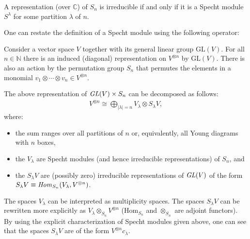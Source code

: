     \begin{property}
        A representation (over $\mathbb{C}$) of $S_n$ is irreducible if and only if it is a Specht module $S^\lambda$ for some partition $\lambda$ of $n$.
    \end{property}

    One can restate the definition of a Specht module using the following operator:

    Consider a vector space $V$ together with its general linear group $\text{GL}(V)$. For all $n\in\mathbb{N}$ there is an induced (diagonal) representation on $V^{\otimes n}$ by $\text{GL}(V)$. There is also an action by the permutation group $S_n$ that permutes the elements in a monomial $v_1\otimes\cdots\otimes v_n\in V^{\otimes n}$.
    \begin{theorem}
        The above representation of $\text{\emph{GL}}(V)\times S_n$ can be decomposed as follows:
        \begin{gather}
            V^{\otimes n}\cong\bigoplus_{|\lambda|=n}V_\lambda\otimes S_\lambda V,
        \end{gather}
        where:
        \begin{itemize}
            \item the sum ranges over all partitions of $n$ or, equivalently, all Young diagrams with $n$ boxes,
            \item the $V_\lambda$ are Specht modules (and hence irreducible representations) of $S_n$, and
            \item the $S_\lambda V$ are (possibly zero) irreducible representations of $\text{\emph{GL}}(V)$ of the form $S_\lambda V \equiv\text{\emph{Hom}}_{S_n}(V_\lambda, V^{\otimes n})$.
        \end{itemize}
    \end{theorem}
    The spaces $V_\lambda$ can be interpreted as multiplicity spaces. The spaces $S_\lambda V$ can be rewritten more explicitly as $V_\lambda\otimes_{S_n} V^{\otimes n}$ ($\text{Hom}_{S_n}$ and $\otimes_{S_n}$ are adjoint functors). By using the explicit characterization of Specht modules given above, one can see that the spaces $S_\lambda V$ are of the form $V^{\otimes n}c_\lambda$.

